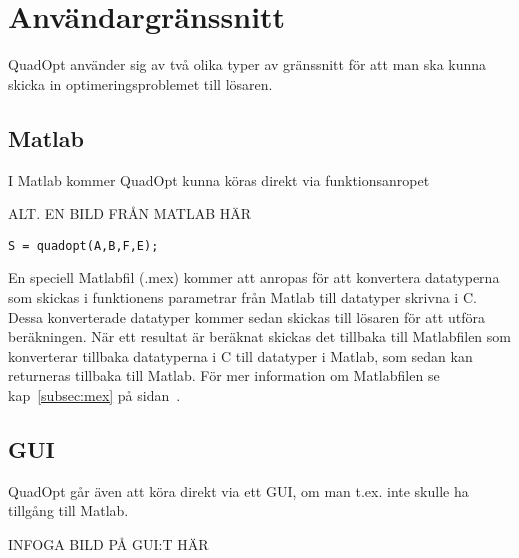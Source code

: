 \section{Användargränssnitt}
QuadOpt använder sig av två olika typer av gränssnitt för att man ska kunna skicka in optimeringsproblemet till lösaren.

\subsection{Matlab}
I Matlab kommer QuadOpt kunna köras direkt via funktionsanropet

ALT. EN BILD FRÅN MATLAB HÄR

\begin{lstlisting}
S = quadopt(A,B,F,E);
\end{lstlisting}
En speciell Matlabfil (.mex) kommer att anropas för att konvertera datatyperna som skickas i funktionens parametrar från Matlab till datatyper skrivna i C. Dessa konverterade datatyper kommer sedan skickas till lösaren för att utföra beräkningen. När ett resultat är beräknat skickas det tillbaka till Matlabfilen som konverterar tillbaka datatyperna i C till datatyper i Matlab, som sedan kan returneras tillbaka till Matlab.
För mer information om Matlabfilen se kap~\ref{subsec:mex} på sidan~\pageref{subsec:mex}.

\subsection{GUI}
QuadOpt går även att köra direkt via ett GUI, om man t.ex. inte skulle ha tillgång till Matlab.

INFOGA BILD PÅ GUI:T HÄR

